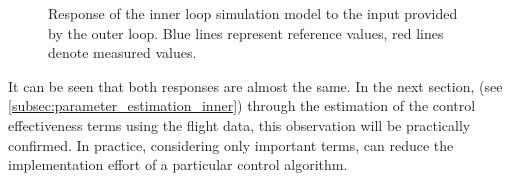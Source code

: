 \documentclass[11pt, a4paper, twoside]{report}
\begin{document}
\begin{figure}[H]
	\centering 
	\captionsetup{justification=centering, singlelinecheck=off, font=bf, belowskip=-0.5cm}
	\caption[Response of the inner loop simulation model to the input provided by the outer loop]{Response of the inner loop simulation model to the input provided by the outer loop. Blue lines represent reference values, red lines denote measured values.}
	\label{fig:sim_inner_all}
\end{figure}It can be seen that both responses are almost the same. In the next section, (see \ref{subsec:parameter_estimation_inner}) through the estimation of the control effectiveness terms using the flight data, this observation will be practically confirmed. In practice, considering only important terms, can reduce the implementation effort of a particular control algorithm.
\end{document}
